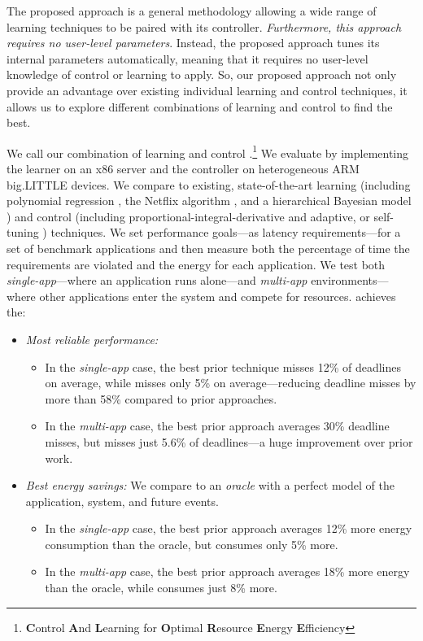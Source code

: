 The proposed approach is a general methodology allowing a wide range
of learning techniques to be paired with its controller.
\emph{Furthermore, this approach requires no user-level parameters}.
Instead, the proposed approach tunes its internal parameters
automatically, meaning that it requires no user-level knowledge of
control or learning to apply.  So, our proposed approach not only
provide an advantage over existing individual learning and control
techniques, it allows us to explore different combinations of learning
and control to find the best.

We call our combination of learning and control
\SYSTEM{}.\footnote{\textbf{C}ontrol \textbf{A}nd \textbf{L}earning
  for \textbf{O}ptimal \textbf{R}esource \textbf{E}nergy
  \textbf{E}fficiency} We evaluate \SYSTEM{} by implementing the
learner on an x86 server and the controller on heterogeneous ARM
big.LITTLE devices.  We compare \SYSTEM{} to existing,
state-of-the-art learning (including polynomial regression
\cite{Koala,dubach2010}, the Netflix algorithm \cite{netflix,Paragon},
and a hierarchical Bayesian model \cite{LEO}) and control (including
proportional-integral-derivative \cite{Hellerstein2004a} and adaptive,
or self-tuning \cite{HandbookControl}) techniques.  We set performance
goals---as latency requirements---for a set of benchmark applications
and then measure both the percentage of time the requirements are
violated and the energy for each application.  We test both
\emph{single-app}---where an application runs alone---and
\emph{multi-app} environments---where other applications enter the
system and compete for resources.  \SYSTEM{} achieves the:
\begin{itemize}[leftmargin=1em]
\item \textit{Most reliable performance:}
  \begin{itemize}[leftmargin=1em]
  \item In the \emph{single-app} case, the best prior technique misses
    12\% of deadlines on average, while \SYSTEM{} misses only 5\% on
    average---reducing deadline misses by more than 58\% compared to
    prior approaches.
  \item In the \emph{multi-app} case, the best prior approach averages
    30\% deadline misses, but \SYSTEM{} misses just 5.6\% of
    deadlines---a huge improvement over prior work.
  \end{itemize}
\item \textit{Best energy savings:} We compare to an \emph{oracle}
  with a perfect model of the application, system, and future events.
  \begin{itemize}[leftmargin=1em]
  \item In the \emph{single-app} case, the best prior approach
    averages 12\% more energy consumption than the oracle, but
    \SYSTEM{} consumes only 5\% more.
  \item In the \emph{multi-app} case, the best prior approach averages
    18\% more energy than the oracle, while \SYSTEM{} consumes just
    8\% more.
  \end{itemize}
\end{itemize}

